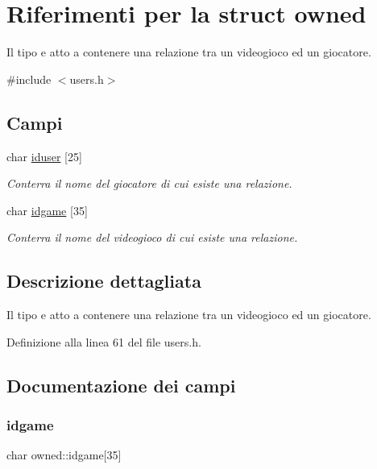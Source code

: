 \hypertarget{structowned}{}\section{Riferimenti per la struct owned}
\label{structowned}


Il tipo e\textquotesingle{} atto a contenere una relazione tra un videogioco ed un giocatore.  




{\ttfamily \#include $<$users.\+h$>$}

\subsection*{Campi}
\begin{DoxyCompactItemize}
\item 
char \hyperlink{structowned_a773d204967beb2a8a56603382086f1e1}{iduser} \mbox{[}25\mbox{]}
\begin{DoxyCompactList}\small\item\em Conterra\textquotesingle{} il nome del giocatore di cui esiste una relazione. \end{DoxyCompactList}\item 
char \hyperlink{structowned_a466a0b0fb52807343747853427e71365}{idgame} \mbox{[}35\mbox{]}
\begin{DoxyCompactList}\small\item\em Conterra\textquotesingle{} il nome del videogioco di cui esiste una relazione. \end{DoxyCompactList}\end{DoxyCompactItemize}


\subsection{Descrizione dettagliata}
Il tipo e\textquotesingle{} atto a contenere una relazione tra un videogioco ed un giocatore. 

Definizione alla linea 61 del file users.\+h.



\subsection{Documentazione dei campi}
\mbox{\label{structowned_a466a0b0fb52807343747853427e71365}} 
\subsubsection{\texorpdfstring{idgame}{idgame}}
{\footnotesize\ttfamily char owned\+::idgame\mbox{[}35\mbox{]}}



